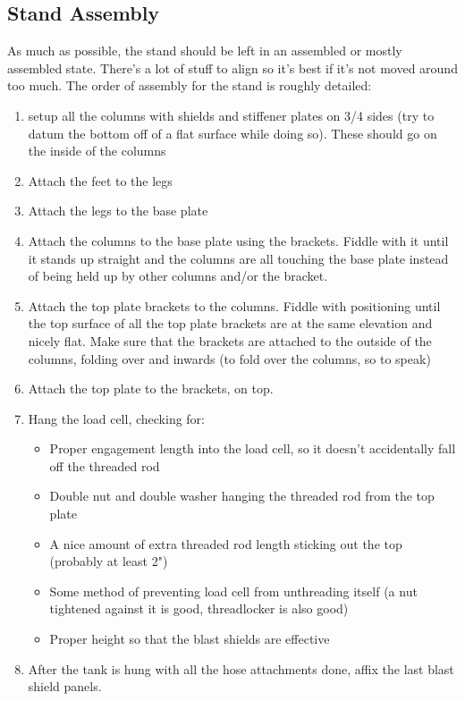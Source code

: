 \documentclass[11pt]{article}
\begin{document}
\subsection{Stand Assembly}
As much as possible, the stand should be left in an assembled or mostly assembled state. There's a lot of stuff to align so it's best if it's not moved around too much. The order of assembly for the stand is roughly detailed:
\begin{enumerate}
	\item setup all the columns with shields and stiffener plates on 3/4 sides (try to datum the bottom off of a flat surface while doing so). These should go on the inside of the columns
	\item Attach the feet to the legs
	\item Attach the legs to the base plate
	\item Attach the columns to the base plate using the brackets. Fiddle with it until it stands up straight and the columns are all touching the base plate instead of being held up by other columns and/or the bracket.
	\item Attach the top plate brackets to the columns. Fiddle with positioning until the top surface of all the top plate brackets are at the same elevation and nicely flat. Make sure that the brackets are attached to the outside of the columns, folding over and inwards (to fold over the columns, so to speak)
	\item Attach the top plate to the brackets, on top.
	\item Hang the load cell, checking for:
		\begin{itemize}
			\item Proper engagement length into the load cell, so it doesn't accidentally fall off the threaded rod
			\item Double nut and double washer hanging the threaded rod from the top plate
			\item A nice amount of extra threaded rod length sticking out the top (probably at least 2")
			\item Some method of preventing load cell from unthreading itself (a nut tightened against it is good, threadlocker is also good)
			\item Proper height so that the blast shields are effective
		\end{itemize}
	\item After the tank is hung with all the hose attachments done, affix the last blast shield panels.
\end{enumerate}
\end{document}
